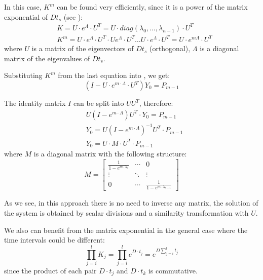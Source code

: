 In this case, $K^m$ can be found very efficiently, since it is a power of the matrix exponential of $D t_s$ (see ):
\begin{align*}
  & K = U \cdot e^{\Lambda} \cdot U^T = U \cdot diag(\lambda_0, \dots, \lambda_{n - 1}) \cdot U^T \\
  & K^m = U \cdot e^{\Lambda} \cdot U^T \cdot U e^{\Lambda} \cdot U^T \dots U \cdot e^{\Lambda} \cdot U^T = U \cdot e^{m \Lambda} \cdot U^T
\end{align*}
where $U$ is a matrix of the eigenvectors of $D t_s$ (orthogonal), $\Lambda$ is a diagonal matrix of the eigenvalues of $D t_s$.

Substituting $K^m$ from the last equation into , we get:
\[
  (I - U \cdot e^{m \cdot \Lambda} \cdot U^T) Y_0 = P_{m - 1}
\]

The identity matrix $I$ can be split into $U U^T$, therefore:
\begin{align*}
  & U (I - e^{m \cdot \Lambda}) U^T \cdot Y_0 = P_{m - 1} \\
  & Y_0 = U (I - e^{m \cdot \Lambda})^{-1} U^T \cdot P_{m - 1} \\
  & Y_0 = U \cdot M \cdot U^T \cdot P_{m - 1}
\end{align*}
where $M$ is a diagonal matrix with the following structure:
\[
  M = \left[
    \begin{array}{ccc}
      \frac{1}{1 - e^{m \cdot \lambda_0}} & \cdots & 0 \\
      \vdots & \ddots & \vdots \\
      0 & \cdots & \frac{1}{1 - e^{m \cdot \lambda_{n - 1}}}
    \end{array}
  \right]
\]

As we see, in this approach there is no need to inverse any matrix, the solution of the system is obtained by scalar divisions and a similarity transformation with $U$.

We also can benefit from the matrix exponential in the general case where the time intervals could be different:
\[
  \prod_{j = i}^l K_j = \prod_{j = i}^l e^{D \cdot t_j} = e^{D \sum_{j = i}^l t_j}
\]
since the product of each pair $D \cdot t_j$ and $D \cdot t_k$ is commutative.
